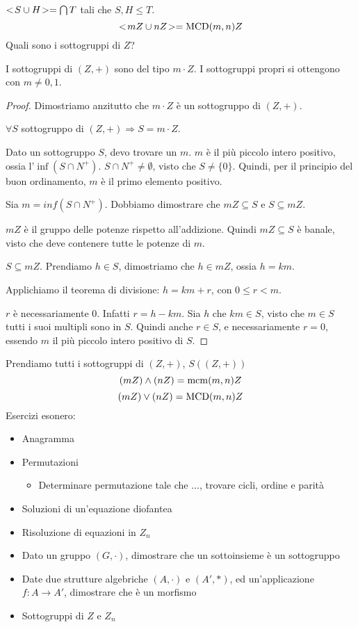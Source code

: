 $<\!{S \cup H}\!> = \bigcap T$ tali che $S, H \le T$.
\[
<\!{m Z \cup n Z}\!> = \operatorname{MCD}(m, n) Z
\]
Quali sono i sottogruppi di $Z$?
\begin{prop}
I sottogruppi di $(Z, +)$ sono del tipo $m \cdot Z$. I sottogruppi propri si ottengono con $m \neq 0, 1$.
\end{prop}
\begin{proof}
Dimostriamo anzitutto che $m \cdot Z$ \`e un sottogruppo di $(Z, +)$.

$\forall S$ sottogruppo di $(Z, +) \Rightarrow S = m \cdot Z$.

Dato un sottogruppo $S$, devo trovare un $m$. $m$ \`e il pi\`u piccolo intero positivo, ossia  l'$\inf (S \cap N^+)$. $S \cap N^+ \neq \emptyset$, visto che $S \neq \{ 0 \}$. Quindi, per il principio del buon ordinamento, $m$ \`e il primo elemento positivo.

Sia $m = inf (S \cap N^+)$. Dobbiamo dimostrare che $m Z \subseteq S$ e $S \subseteq m Z$.

$m Z$ \`e il gruppo delle potenze rispetto all'addizione. Quindi $m Z \subseteq S$ \`e banale, visto che deve contenere tutte le potenze di $m$.

$S \subseteq m Z$. Prendiamo $h \in S$, dimostriamo che $h \in m Z$, ossia $h = k m$.

Applichiamo il teorema di divisione: $h = k m + r$, con $0 \le r < m$.

$r$ \`e necessariamente 0. Infatti $r = h - km$. Sia $h$ che $k m \in S$, visto che $m \in S$ tutti i suoi multipli sono in $S$. Quindi anche $r \in S$, e necessariamente $r = 0$, essendo $m$ il pi\`u piccolo intero positivo di $S$.
\end{proof}
Prendiamo tutti i sottogruppi di $(Z, +)$, $S((Z, +))$
\[
(m Z) \wedge (n Z) = \operatorname{mcm}(m, n) Z
\]
\[
(m Z) \vee (n Z) = \operatorname{MCD}(m, n) Z
\]
Esercizi esonero:
\begin{itemize}
    \item Anagramma
    \item Permutazioni
        \begin{itemize}
            \item Determinare permutazione tale che $\dots$, trovare cicli, ordine e parit\`a
        \end{itemize}
    \item Soluzioni di un'equazione diofantea
    \item Risoluzione di equazioni in $Z_n$
    \item Dato un gruppo $(G, \cdot)$, dimostrare che un sottoinsieme \`e un sottogruppo
    \item Date due strutture algebriche $(A, \cdot)$ e $(A', \ast)$, ed un'applicazione $f : A \to A'$, dimostrare che \`e un morfismo
    \item Sottogruppi di $Z$ e $Z_n$
\end{itemize}
